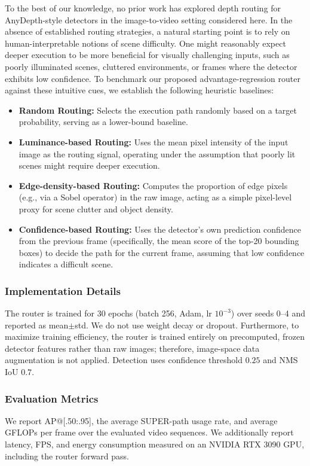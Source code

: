 To the best of our knowledge, no prior work has explored depth routing for AnyDepth-style detectors in the image-to-video setting considered here. 
In the absence of established routing strategies, a natural starting point is to rely on human-interpretable notions of scene difficulty. 
One might reasonably expect deeper execution to be more beneficial for visually challenging inputs, such as poorly illuminated scenes, cluttered environments, or frames where the detector exhibits low confidence. 
To benchmark our proposed advantage-regression router against these intuitive cues, we establish the following heuristic baselines:
\begin{itemize}
    \item \textbf{Random Routing:} Selects the execution path randomly based on a target probability, serving as a lower-bound baseline.
    \item \textbf{Luminance-based Routing:} Uses the mean pixel intensity of the input image as the routing signal, operating under the assumption that poorly lit scenes might require deeper execution.
    \item \textbf{Edge-density-based Routing:} Computes the proportion of edge pixels (e.g., via a Sobel operator) in the raw image, acting as a simple pixel-level proxy for scene clutter and object density.
    \item \textbf{Confidence-based Routing:} Uses the detector's own prediction confidence from the previous frame (specifically, the mean score of the top-20 bounding boxes) to decide the path for the current frame, assuming that low confidence indicates a difficult scene.
\end{itemize}



\subsubsection{Implementation Details}
\label{sec:setup_impl}
The router is trained for 30 epochs (batch 256, Adam, lr $10^{-3}$) over seeds 0--4
and reported as mean$\pm$std. 
We do not use weight decay or dropout. 
Furthermore, to maximize training efficiency, the router is trained entirely on precomputed, frozen detector features rather than raw images; therefore, image-space data augmentation is not applied.
Detection uses confidence threshold $0.25$ and NMS IoU $0.7$.


\subsubsection{Evaluation Metrics}
\label{sec:setup_metrics}
We report AP@[.50:.95], the average SUPER-path usage rate, and average GFLOPs per frame over the evaluated video sequences.
We additionally report latency, FPS, and energy consumption measured on an NVIDIA RTX 3090 GPU, including the router forward pass.



